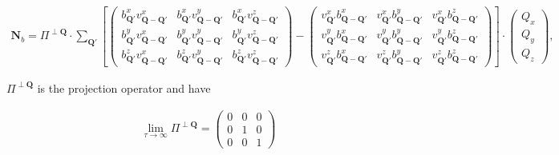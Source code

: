 \documentclass[prb,singlecolumn]{revtex4}
\begin{document}
\begin{eqnarray}
\mathbf{N}_b  = \Pi^{\perp\mathbf{Q}}\cdot\sum_{\mathbf{Q}'}
\left[
\left(\begin{array}{ccc}
b_{\mathbf{Q}'}^xv_{\mathbf{Q}-\mathbf{Q}'}^x & b_{\mathbf{Q}'}^xv_{\mathbf{Q}-\mathbf{Q}'}^y & b_{\mathbf{Q}'}^xv_{\mathbf{Q}-\mathbf{Q}'}^z \\
b_{\mathbf{Q}'}^yv_{\mathbf{Q}-\mathbf{Q}'}^x & b_{\mathbf{Q}'}^yv_{\mathbf{Q}-\mathbf{Q}'}^y & b_{\mathbf{Q}'}^yv_{\mathbf{Q}-\mathbf{Q}'}^z \\
b_{\mathbf{Q}'}^zv_{\mathbf{Q}-\mathbf{Q}'}^x & b_{\mathbf{Q}'}^zv_{\mathbf{Q}-\mathbf{Q}'}^y & b_{\mathbf{Q}'}^zv_{\mathbf{Q}-\mathbf{Q}'}^z
\end{array} \right)
-
\left(\begin{array}{ccc}
v_{\mathbf{Q}'}^xb_{\mathbf{Q}-\mathbf{Q}'}^x & v_{\mathbf{Q}'}^xb_{\mathbf{Q}-\mathbf{Q}'}^y & v_{\mathbf{Q}'}^xb_{\mathbf{Q}-\mathbf{Q}'}^z \\
v_{\mathbf{Q}'}^yb_{\mathbf{Q}-\mathbf{Q}'}^x & v_{\mathbf{Q}'}^yb_{\mathbf{Q}-\mathbf{Q}'}^y & v_{\mathbf{Q}'}^yb_{\mathbf{Q}-\mathbf{Q}'}^z \\
v_{\mathbf{Q}'}^zb_{\mathbf{Q}-\mathbf{Q}'}^x & v_{\mathbf{Q}'}^zb_{\mathbf{Q}-\mathbf{Q}'}^y & v_{\mathbf{Q}'}^zb_{\mathbf{Q}-\mathbf{Q}'}^z
\end{array} \right)
\right]
\cdot
\left(\begin{array}{c}
Q_x \\
Q_y \\
Q_z
\end{array} \right),
\end{eqnarray}


$\Pi^{\perp\mathbf{Q}}$ is the projection operator and have

\begin{eqnarray}
\lim\limits_{\tau \rightarrow \infty}{ \Pi^{\perp\mathbf{Q}} } = \left(\begin{array}{ccc}
 0 & 0 & 0 \\
 0 & 1 & 0 \\
 0 & 0 & 1 
\end{array} \right)
\end{eqnarray}
\end{document}
